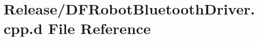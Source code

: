 \hypertarget{_release_2_d_f_robot_bluetooth_driver_8cpp_8d}{\section{\-Release/\-D\-F\-Robot\-Bluetooth\-Driver.cpp.\-d \-File \-Reference}
\label{_release_2_d_f_robot_bluetooth_driver_8cpp_8d}
}
